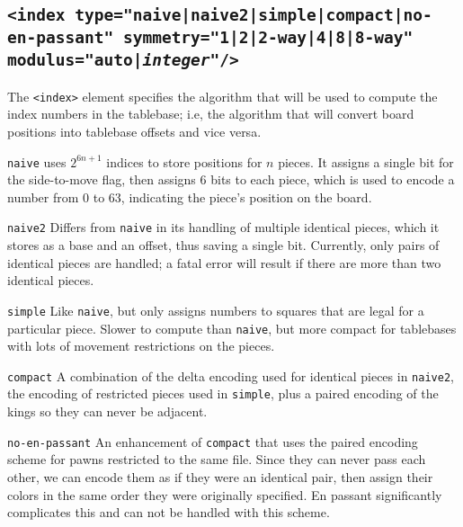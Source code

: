 \documentclass[11pt]{article}
\begin{document}
\subsection{\tt <index type="naive|naive2|simple|compact|no-en-passant" \hfil\break\hbox{\qquad} symmetry="1|2|2-way|4|8|8-way" modulus="auto|{\it integer}"/>}

The {\tt <index>} element specifies the algorithm that will be used to
compute the index numbers in the tablebase; i.e, the algorithm that
will convert board positions into tablebase offsets and vice versa.

\begin{description}

\item {\tt naive} uses $2^{6n+1}$ indices to store positions for $n$ pieces.
It assigns a single bit for the side-to-move flag, then assigns 6 bits
to each piece, which is used to encode a number from 0 to 63,
indicating the piece's position on the board.

\item {\tt naive2} Differs from {\tt naive} in its handling of multiple
identical pieces, which it stores as a base and an offset, thus saving
a single bit.  Currently, only pairs of identical pieces are handled;
a fatal error will result if there are more than two identical pieces.

\item {\tt simple} Like {\tt naive}, but only assigns numbers to
squares that are legal for a particular piece.  Slower to compute than
{\tt naive}, but more compact for tablebases with lots of movement
restrictions on the pieces.

\item {\tt compact} A combination of the delta encoding used for
identical pieces in {\tt naive2}, the encoding of restricted pieces used
in {\tt simple}, plus a paired encoding of the kings so they can never be
adjacent.

\item {\tt no-en-passant} An enhancement of {\tt compact} that uses
the paired encoding scheme for pawns restricted to the same file.
Since they can never pass each other, we can encode them as if they
were an identical pair, then assign their colors in the same order
they were originally specified.  En passant significantly complicates
this and can not be handled with this scheme.

\end{description}
\end{document}
